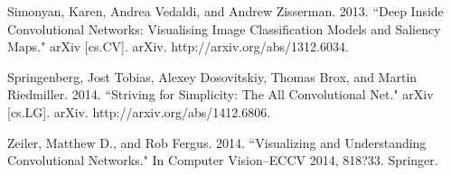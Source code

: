 \documentclass{article}
\begin{document}
Simonyan, Karen, Andrea Vedaldi, and Andrew Zisserman. 2013. ``Deep Inside Convolutional Networks: Visualising Image Classification Models and Saliency Maps." arXiv [cs.CV]. arXiv. http://arxiv.org/abs/1312.6034.

Springenberg, Jost Tobias, Alexey Dosovitskiy, Thomas Brox, and Martin Riedmiller. 2014. ``Striving for Simplicity: The All Convolutional Net." arXiv [cs.LG]. arXiv. http://arxiv.org/abs/1412.6806.

Zeiler, Matthew D., and Rob Fergus. 2014. ``Visualizing and Understanding Convolutional Networks." In Computer Vision--ECCV 2014, 818?33. Springer.
\end{document}
